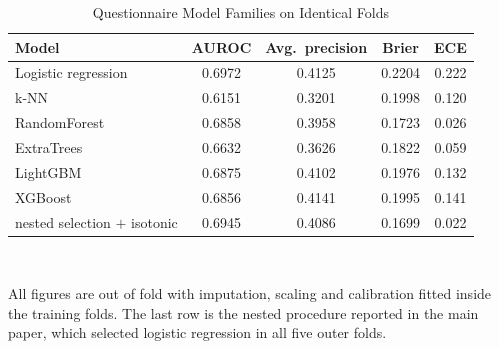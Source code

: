 \begin{table}[!htbp]
\caption{Questionnaire Model Families on Identical Folds}
\label{tab:sfamilies}
\centering\footnotesize
\begin{tabular}{@{}lcccc@{}}
\toprule
Model & AUROC & Avg.\ precision & Brier & ECE \\
\midrule
Logistic regression & 0.6972 & 0.4125 & 0.2204 & 0.222 \\
k-NN & 0.6151 & 0.3201 & 0.1998 & 0.120 \\
RandomForest & 0.6858 & 0.3958 & 0.1723 & 0.026 \\
ExtraTrees & 0.6632 & 0.3626 & 0.1822 & 0.059 \\
LightGBM & 0.6875 & 0.4102 & 0.1976 & 0.132 \\
XGBoost & 0.6856 & 0.4141 & 0.1995 & 0.141 \\
\midrule nested selection $+$ isotonic & 0.6945 & 0.4086 & 0.1699 & 0.022 \\
\bottomrule
\end{tabular}
\\[2pt]\begin{minipage}{\textwidth}\scriptsize All figures are out of fold with imputation, scaling and calibration fitted inside the training folds. The last row is the nested procedure reported in the main paper, which selected logistic regression in all five outer folds.\end{minipage}
\end{table}
